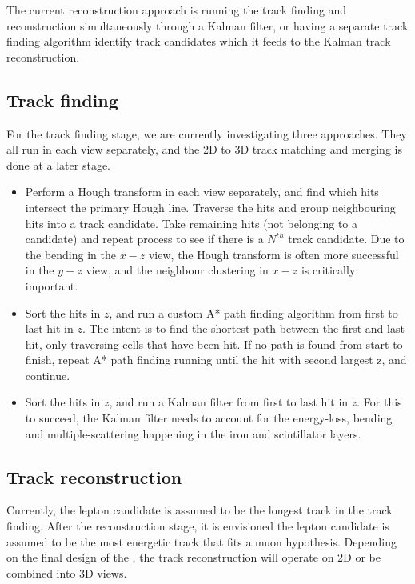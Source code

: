 \documentclass[../main-v1.tex]{subfiles}
\begin{document}
The current  reconstruction approach is running the track finding and reconstruction simultaneously through a Kalman filter, or having a separate track finding algorithm identify track candidates which it feeds to the Kalman track reconstruction.

\subsection{Track finding}
For the track finding stage, we are currently investigating three approaches. They all run in each view separately, and the 2D to 3D track matching and merging is done at a later stage.

\begin{itemize}
    \item Perform a Hough transform \cite{hough} in each view separately, and find which hits intersect the primary Hough line. Traverse the hits and group neighbouring hits into a track candidate. Take remaining hits (not belonging to a candidate) and repeat process to see if there is a $N^{th}$ track candidate. Due to the bending in the $x-z$ view, the Hough transform is often more successful in the $y-z$ view, and the neighbour clustering in $x-z$ is critically important.

    \item Sort the hits in $z$, and run a custom A* path finding algorithm from first to last hit in $z$. The intent is to find the shortest path between the first and last hit, only traversing cells that have been hit. If no path is found from start to finish, repeat A* path finding running until the hit with second largest z, and continue.
    
    \item Sort the hits in $z$, and run a Kalman filter from first to last hit in $z$. For this to succeed, the Kalman filter needs to account for the energy-loss, bending and multiple-scattering happening in the iron and scintillator layers. 
\end{itemize}

\subsection{Track reconstruction}
Currently, the lepton candidate is assumed to be the longest track in the track finding. After the reconstruction stage, it is envisioned the lepton candidate is assumed to be the most energetic track that fits a muon hypothesis. Depending on the final design of the , the track reconstruction will operate on 2D or be combined into 3D views. 
\end{document}

